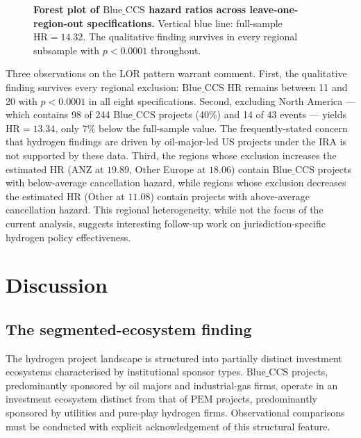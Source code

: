 \documentclass[11pt,a4paper]{article}
\newcommand{\HR}{\mathrm{HR}}
\newcommand{\BlueCCS}{\mathrm{Blue\_CCS}}
\newcommand{\PEM}{\mathrm{PEM}}
\begin{document}
\begin{figure}[H]
\centering
\caption{\textbf{Forest plot of $\BlueCCS$ hazard ratios across leave-one-region-out specifications.} Vertical blue line: full-sample $\HR = 14.32$. The qualitative finding survives in every regional subsample with $p < 0.0001$ throughout.}
\label{fig:lor}
\end{figure}

Three observations on the LOR pattern warrant comment. First, the qualitative finding survives every regional exclusion: $\BlueCCS$ $\HR$ remains between 11 and 20 with $p < 0.0001$ in all eight specifications. Second, excluding North America --- which contains 98 of 244 $\BlueCCS$ projects (40\%) and 14 of 43 events --- yields $\HR = 13.34$, only $7\%$ below the full-sample value. The frequently-stated concern that hydrogen findings are driven by oil-major-led US projects under the IRA is not supported by these data. Third, the regions whose exclusion increases the estimated $\HR$ (ANZ at $19.89$, Other Europe at $18.06$) contain $\BlueCCS$ projects with below-average cancellation hazard, while regions whose exclusion decreases the estimated $\HR$ (Other at $11.08$) contain projects with above-average cancellation hazard. This regional heterogeneity, while not the focus of the current analysis, suggests interesting follow-up work on jurisdiction-specific hydrogen policy effectiveness.

\section{Discussion}

\subsection{The segmented-ecosystem finding}

The hydrogen project landscape is structured into partially distinct investment ecosystems characterised by institutional sponsor types. $\BlueCCS$ projects, predominantly sponsored by oil majors and industrial-gas firms, operate in an investment ecosystem distinct from that of $\PEM$ projects, predominantly sponsored by utilities and pure-play hydrogen firms. Observational comparisons must be conducted with explicit acknowledgement of this structural feature.
\end{document}
